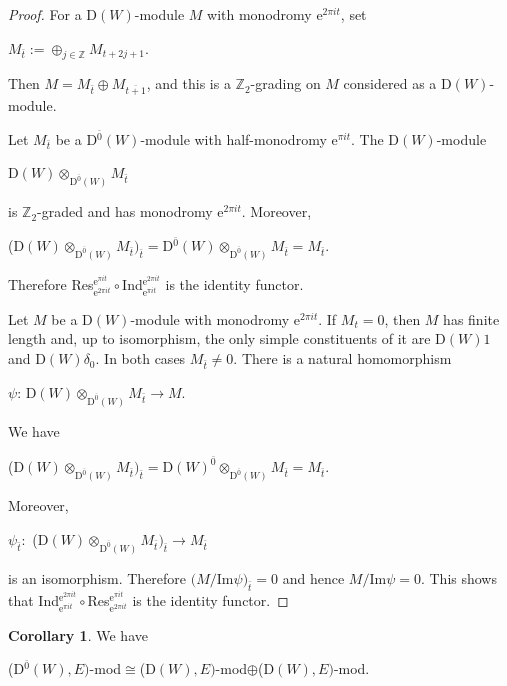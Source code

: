 \documentclass[12pt]{amsart}
\theoremstyle{definition}\newtheorem{theorem}{Theorem}[section]
\newtheorem{corollary}[proposition]{Corollary}
\theoremstyle{definition}\newtheorem{definition}[proposition]{Definition}
\theoremstyle{remark}\newtheorem{example}[proposition]{Example}
\renewcommand{\to}[1][]{\xrightarrow{#1}}
\begin{document}
\begin{proof}For a D$(W)$-module $M$ with monodromy e$^{2\pi it}$, set \begin{center}$M_{\bar t}:=\oplus_{j\in\mathbb Z}M_{t+2j+1}$.\end{center}Then $M=M_{\bar t}\oplus M_{\overline{t+1}}$, and this is a $\mathbb Z_2$-grading on $M$ considered as a D$(W)$-module.

Let $M_{\bar t}$ be a D$^{\bar 0}(W)$-module with half-monodromy e$^{\pi it}$. The D$(W)$-module \begin{center}D$(W)\otimes_{\mathrm D^{\bar0}(W)}M_{\bar t}$\end{center} is $\mathbb Z_2$-graded and has monodromy e$^{2\pi it}$. Moreover,\begin{center}(D$(W)\otimes_{\mathrm D^{\bar0}(W)}M_{\bar t})_{\bar t}=$D$^{\bar 0}(W)\otimes_{\mathrm D^{\bar0}(W)}M_{\bar t}=M_{\bar t}$.\end{center} Therefore Res$^{\mathrm e^{\pi it}}_{\mathrm e^{2\pi it}}\circ$Ind$_{\mathrm e^{\pi it}}^{\mathrm e^{2\pi it}}$ is the identity functor.

Let $M$ be a D$(W)$-module with monodromy e$^{2\pi it}$. If $M_t=0$, then $M$ has finite length and, up to isomorphism, the only simple constituents of it are D$(W)1$ and D$(W)\delta_0$. In both cases $M_{\bar t}\ne 0$. There is a natural homomorphism \begin{center}$\psi$: D$(W)\otimes_{\mathrm D^{\bar0}(W)}M_{\bar t}\to M$.\end{center} We have \begin{center}(D$(W)\otimes_{\mathrm D^{\bar0}(W)}M_{\bar t})_{\bar t}=$D$(W)^{\bar 0}\otimes_{\mathrm D^{\bar0}(W)}M_{\bar t}=M_{\bar t}$.\end{center}Moreover,\begin{center}$\psi_{\bar t}:$ (D$(W)\otimes_{\mathrm D^{\bar0}(W)}M_{\bar t})_{\bar t}\to M_{\bar t}$\end{center} is an isomorphism. Therefore $(M/$Im$\psi)_{\bar t}=0$ and hence $M/$Im$\psi=0$. This shows that Ind$_{\mathrm e^{\pi it}}^{\mathrm e^{2\pi it}}\circ$Res$^{\mathrm e^{\pi it}}_{\mathrm e^{2\pi it}}$ is the identity functor.\end{proof}
\begin{corollary}We have \begin{center}(D$^{\bar 0}(W), E)$-mod$\cong$(D$(W), E)$-mod$\oplus$(D$(W), E)$-mod.\end{center}\end{corollary}
\end{document}
